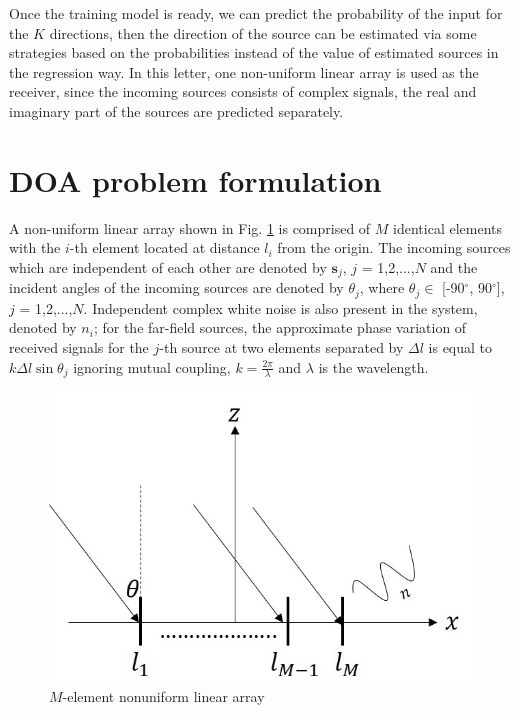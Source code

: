 \documentclass[journal]{IEEEtran}
\begin{document}
Once the training model is ready, we can predict the probability of the input for the $K$ directions, then the direction of the source can be estimated via some strategies based on the probabilities instead of the value of estimated sources in the regression way. In this letter, one non-uniform linear array is used as the receiver, since the incoming sources consists of complex signals, the real and imaginary part of the sources are predicted separately.    

\section{DOA problem formulation} \label{model}
A non-uniform linear array shown in Fig. \ref{fig:towerloc} is comprised of $M$ identical elements with the $i$-th element located at distance $l_{i}$ from the origin. The incoming sources which are independent of each other are denoted by $\mathbf{s}_{j}$, $j$ = 1,2,...,$N$ and the incident angles of the incoming sources are denoted by $\theta_{j}$, where $\theta_{j} \in$ [-90$^{\circ}$, 90$^{\circ}$], $j$ = 1,2,...,$N$. Independent complex white noise is also present in the system, denoted by $n_{i}$; for the far-field sources, the approximate phase variation of received signals for the $j$-th source at two elements separated by $\Delta l$ is equal to $k\Delta l \sin\theta_{j}$ ignoring mutual coupling, $k=\frac{2\pi }{\lambda }$ and $\lambda$ is the wavelength.   
\begin{figure}[t]
	\centering
	\includegraphics[width=0.8\columnwidth]{BCSModel}
	\caption{$M$-element nonuniform linear array}
	\label{fig:towerloc}
\end{figure}
\end{document}
